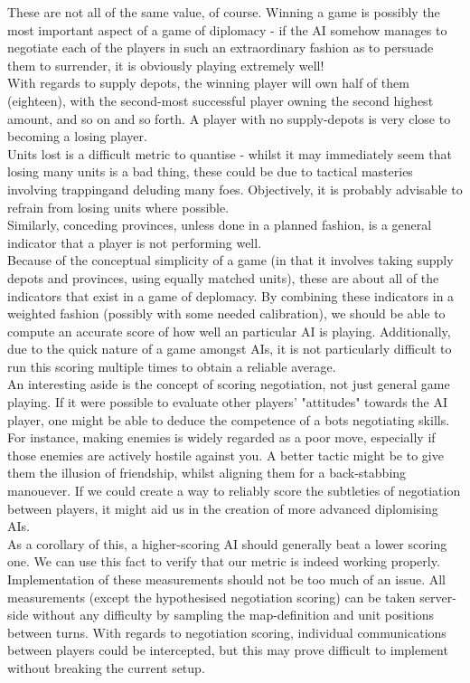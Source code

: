 \documentclass[11pt]{article}
\begin{document}
These are not all of the same value, of course. Winning a game is possibly the
most important aspect of a game of diplomacy - if the AI somehow manages to 
negotiate each of the players in such an extraordinary fashion as to persuade
them to surrender, it is obviously playing extremely well! 
\\
With regards to supply depots, the winning player will own half of them 
(eighteen), with the second-most successful player owning the second highest 
amount, and so on and so forth. A player with no supply-depots is very close
to becoming a losing player.
\\
Units lost is a difficult metric to quantise - whilst it may immediately seem
that losing many units is a bad thing, these could be due to tactical masteries
involving trappingand deluding many foes. Objectively, it is probably advisable
to refrain from losing units where possible.
\\
Similarly, conceding provinces, unless done in a planned fashion, is a general
indicator that a player is not performing well.
\\
Because of the conceptual simplicity of a game (in that it involves taking 
supply depots and provinces, using equally matched units), these are about all 
of the indicators that exist in a game of deplomacy.  By combining these 
indicators in a weighted fashion (possibly with some needed calibration), we
should be able to compute an accurate score of how well an particular AI is 
playing. Additionally, due to the quick nature of a game amongst AIs, it is not
particularly difficult to run this scoring multiple times to obtain a reliable
average.
\\
An interesting aside is the concept of scoring negotiation, not just general 
game playing. If it were possible to evaluate other players' "attitudes" towards
the AI player, one might be able to deduce the competence of a bots negotiating
skills. For instance, making enemies is widely regarded as a poor move,
especially if those enemies are actively hostile against you. A better tactic 
might be to give them the illusion of friendship, whilst aligning them for a
back-stabbing manouever. If we could create a way to reliably score the 
subtleties of negotiation between players, it might aid us in the creation of
more advanced diplomising AIs.
\\
As a corollary of this, a higher-scoring AI should generally beat a lower 
scoring one. We can use this fact to verify that our metric is indeed working
properly. 
\\
Implementation of these measurements should not be too much of an issue. All 
measurements (except the hypothesised negotiation scoring) can be taken 
server-side without any difficulty by sampling the map-definition and unit 
positions between turns. With regards to negotiation scoring, individual 
communications between players could be intercepted, but this may prove
difficult to implement without breaking the current setup.
\end{document}
